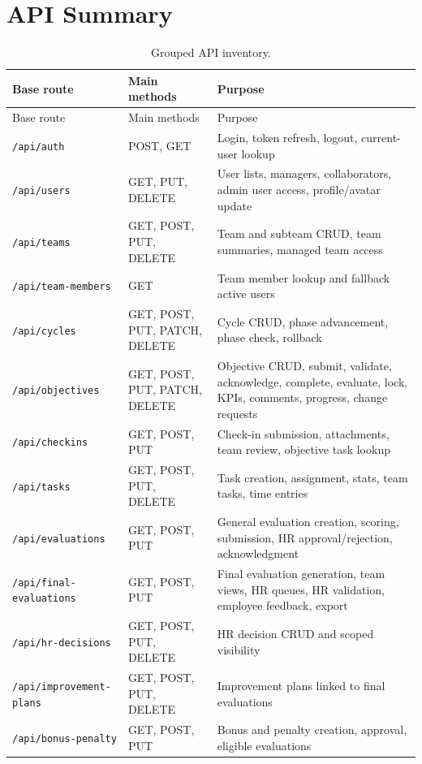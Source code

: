 \chapter{API Summary}
\begin{longtable}{p{}p{}p{}}
\caption{Grouped API inventory.}\label{tab:api-summary}\\
\toprule
Base route & Main methods & Purpose\\
\midrule
\endfirsthead
\toprule
Base route & Main methods & Purpose\\
\midrule
\endhead
\texttt{/api/auth} & POST, GET & Login, token refresh, logout, current-user lookup\\
\texttt{/api/users} & GET, PUT, DELETE & User lists, managers, collaborators, admin user access, profile/avatar update\\
\texttt{/api/teams} & GET, POST, PUT, DELETE & Team and subteam CRUD, team summaries, managed team access\\
\texttt{/api/team-members} & GET & Team member lookup and fallback active users\\
\texttt{/api/cycles} & GET, POST, PUT, PATCH, DELETE & Cycle CRUD, phase advancement, phase check, rollback\\
\texttt{/api/objectives} & GET, POST, PUT, PATCH, DELETE & Objective CRUD, submit, validate, acknowledge, complete, evaluate, lock, KPIs, comments, progress, change requests\\
\texttt{/api/checkins} & GET, POST, PUT & Check-in submission, attachments, team review, objective task lookup\\
\texttt{/api/tasks} & GET, POST, PUT, DELETE & Task creation, assignment, stats, team tasks, time entries\\
\texttt{/api/evaluations} & GET, POST, PUT & General evaluation creation, scoring, submission, HR approval/rejection, acknowledgment\\
\texttt{/api/final-evaluations} & GET, POST, PUT & Final evaluation generation, team views, HR queues, HR validation, employee feedback, export\\
\texttt{/api/hr-decisions} & GET, POST, PUT, DELETE & HR decision CRUD and scoped visibility\\
\texttt{/api/improvement-plans} & GET, POST, PUT, DELETE & Improvement plans linked to final evaluations\\
\texttt{/api/bonus-penalty} & GET, POST, PUT & Bonus and penalty creation, approval, eligible evaluations\\

\end{longtable}
